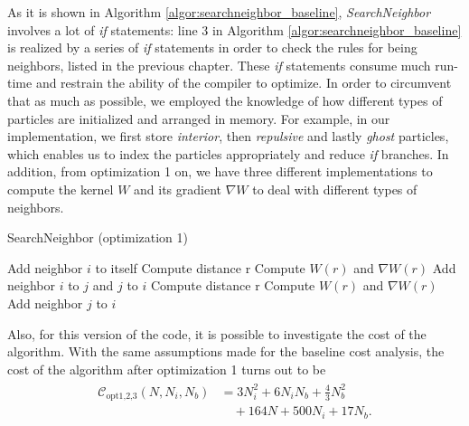 \documentclass[letterpaper]{article}
\begin{document}
As it is shown in Algorithm \ref{algor:searchneighbor_baseline}, \emph{SearchNeighbor} involves a lot of \emph{if} statements: line 3 in Algorithm \ref{algor:searchneighbor_baseline} is realized by a series of \emph{if} statements in order to check the rules for being neighbors, listed in the previous chapter. These \emph{if} statements consume much run-time and restrain the ability of the compiler to optimize. In order to circumvent that as much as possible, we employed the knowledge of how different types of particles are initialized and arranged in memory. For example, in our implementation, we first store \emph{interior}, then \emph{repulsive} and lastly \emph{ghost} particles, which enables us to index the particles appropriately and reduce \emph{if} branches. In addition, from optimization 1 on, we have three different implementations to compute the kernel $W$ and its gradient $\nabla W$ to deal with different types of neighbors. 
\begin{algorithm} 
\begin{algorithmic}[1]
\caption{SearchNeighbor (optimization 1)}
\label{algor:searchneighbor_op_1}
    \STATE Add neighbor $i$ to itself
\ENDFOR
{}
        \STATE Compute distance r
            \STATE Compute $W(r)$ and $\nabla W(r)$
            \STATE Add neighbor $i$ to $j$ and $j$ to $i$
        \ENDIF
    \ENDFOR
\ENDFOR
{}
        \STATE Compute distance r
            \STATE Compute $W(r)$ and $\nabla W(r)$
            \STATE Add neighbor $j$ to $i$
        \ENDIF
    \ENDFOR
\ENDFOR
\end{algorithmic}  
\end{algorithm}

Also, for this version of the code, it is possible to investigate the cost of the algorithm. With the same assumptions made for the baseline cost analysis, the cost of the algorithm after optimization 1 turns out to be 
\begin{align} \label{eq-cost_opt1}
    \begin{split}
    \mathcal{C}_{\text{opt1,2,3}}(N, N_i, N_b) &= 3N_i^2 + 6N_i N_b + \frac{4}{3}N_b^2 \\
    &\quad+ 164N + 500N_i + 17N_b .
    \end{split}
\end{align}
\end{document}
